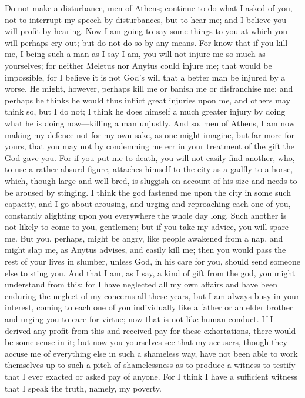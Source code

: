 Do not make a disturbance, men of Athens; continue to do what I asked of you, not to interrupt my speech by disturbances, but to hear me; and I believe you will profit by hearing. Now I am going to say some things to you at which you will perhaps cry out; but do not do so by any means. For know that if you kill me, I being such a man as I say I am, you will not injure me so much as yourselves; for neither Meletus nor Anytus could injure me;  that would be impossible, for I believe it is not God's will that a better man be injured by a worse. He might, however, perhaps kill me or banish me or disfranchise me; and perhaps he thinks he would thus inflict great injuries upon me, and others may think so, but I do not; I think he does himself a much greater injury by doing what he is doing now—killing a man unjustly. And so, men of Athens, I am now making my defence not for my own sake, as one might imagine, but far more for yours, that you may not by condemning me err in your treatment of the gift the God gave you.  For if you put me to death, you will not easily find another, who, to use a rather absurd figure, attaches himself to the city as a gadfly to a horse, which, though large and well bred, is sluggish on account of his size and needs to be aroused by stinging. I think the god fastened me upon the city in some such capacity, and I go about arousing,  and urging and reproaching each one of you, constantly alighting upon you everywhere the whole day long. Such another is not likely to come to you, gentlemen; but if you take my advice, you will spare me. But you, perhaps, might be angry, like people awakened from a nap, and might slap me, as Anytus advises, and easily kill me; then you would pass the rest of your lives in slumber, unless God, in his care for you, should send someone else to sting you. And that I am, as I say, a kind of gift from the god,  you might understand from this; for I have neglected all my own affairs and have been enduring the neglect of my concerns all these years, but I am always busy in your interest, coming to each one of you individually like a father or an elder brother and urging you to care for virtue; now that is not like human conduct. If I derived any profit from this and received pay for these exhortations, there would be some sense in it; but now you yourselves see that my accusers, though they accuse me of everything else in such a shameless way, have not been able to work themselves up to such a pitch of shamelessness  as to produce a witness to testify that I ever exacted or asked pay of anyone. For I think I have a sufficient witness that I speak the truth, namely, my poverty.

